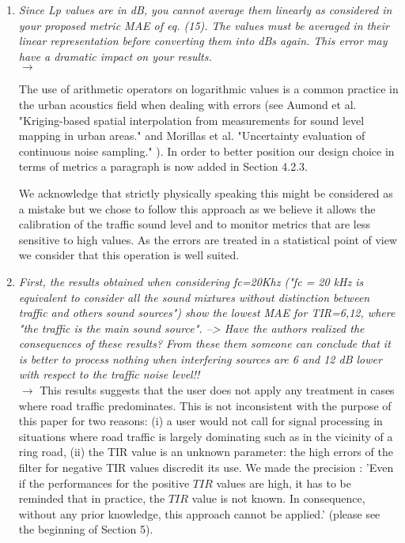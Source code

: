 \documentclass[10pt]{article}
\begin{document}
\begin{enumerate}
\item \emph{Since Lp values are in dB, you cannot average them linearly as considered in your proposed metric MAE of eq. (15). The values must be averaged in their linear representation before converting them into dBs again. This error may have a dramatic impact on your results.}\\
$\rightarrow$

The use of arithmetic operators on logarithmic values is a common practice in the urban acoustics field when dealing with errors (see Aumond et al. "Kriging-based spatial interpolation from measurements for sound level mapping in urban areas." \cite{aumond2018kriging}  and Morillas et al. "Uncertainty evaluation of continuous noise sampling." \cite{morillas2014uncertainty}). In order to  better position our design choice in terms of metrics a paragraph is now added in Section 4.2.3.

We acknowledge that strictly physically speaking this might be considered as a mistake but we chose to follow this approach as we believe it allows the calibration of the traffic sound level and  to monitor metrics that are less sensitive to high values. As the errors are treated in a statistical point of view we consider that this operation is well suited.


\item \emph{First, the results obtained when considering fc=20Khz ("fc = 20 kHz is equivalent to consider all the sound mixtures without distinction between traffic and others sound sources") show the lowest MAE for TIR={6,12}, where "the traffic is the main sound source".
--> Have the authors realized the consequences of these results? From these them someone can conclude that it is better to process nothing when interfering sources are 6 and 12 dB lower with respect to the traffic noise level!!}\\
$\rightarrow$ This results suggests that the user does not apply any treatment in cases where road traffic predominates. This is not inconsistent with the purpose of this paper for two reasons: (i) a user would not call for signal processing in situations where road traffic is largely dominating such as in the vicinity of a ring road, (ii) the TIR value is an unknown parameter: the high errors of the filter for negative TIR values discredit its use. We made the precision :
'Even if the performances for the positive $TIR$ values are high, it has to be reminded that in practice, the $TIR$ value is not known. In consequence, without any prior knowledge, this approach cannot be applied.' (please see the beginning of Section 5).




\end{enumerate}
\end{document}
